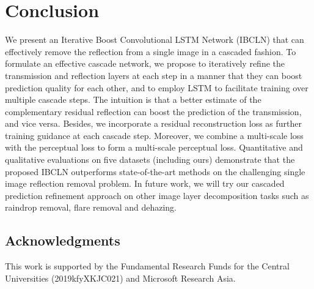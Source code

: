 \documentclass[10pt,twocolumn,letterpaper]{article}
\begin{document}
\section{Conclusion}
We present an Iterative Boost Convolutional LSTM Network (IBCLN) that can effectively remove the reflection from a single image in a cascaded fashion. To formulate an effective cascade network, 
we propose to iteratively refine the transmission and reflection layers at each step in a manner that they can boost prediction quality for each other, and to employ LSTM to facilitate training over multiple cascade steps. The intuition is that a better estimate of the complementary residual reflection can boost the prediction of the transmission, and vice versa. Besides, we incorporate a residual reconstruction loss as further training guidance at each cascade step.  
Moreover, we combine a multi-scale loss with the perceptual loss to form a multi-scale perceptual loss. Quantitative and qualitative evaluations on five datasets (including ours) demonstrate that the proposed IBCLN outperforms state-of-the-art methods on the challenging single image reflection removal problem. 
In future work, we will try our cascaded prediction refinement approach on other image layer decomposition tasks such as raindrop removal, flare removal and dehazing.

\vspace{-0.5em}    
\subsection*{Acknowledgments}
This work is supported by the Fundamental Research Funds for the Central Universities (2019kfyXKJC021) and Microsoft Research Asia.

{\small
    
    
}
    
\end{document}
